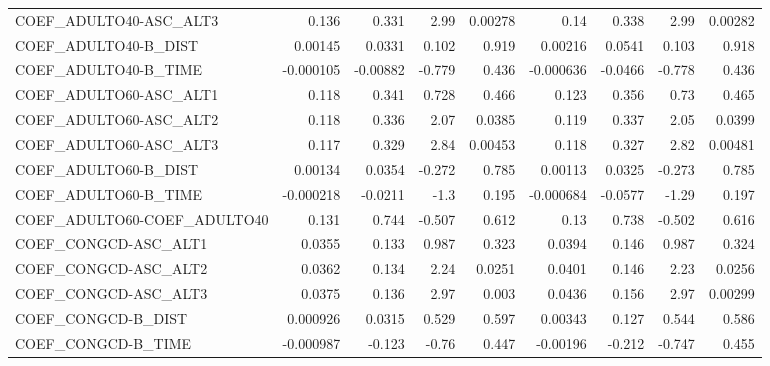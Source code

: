 \begin{tabular}{lrrrrrrrr}
COEF\_ADULTO40-ASC\_ALT3            &       0.136 &        0.331 &    2.99 &  0.00278 &       0.14 &       0.338 &         2.99 &       0.00282 \\
COEF\_ADULTO40-B\_DIST              &     0.00145 &       0.0331 &   0.102 &    0.919 &    0.00216 &      0.0541 &        0.103 &         0.918 \\
COEF\_ADULTO40-B\_TIME              &   -0.000105 &     -0.00882 &  -0.779 &    0.436 &  -0.000636 &     -0.0466 &       -0.778 &         0.436 \\
COEF\_ADULTO60-ASC\_ALT1            &       0.118 &        0.341 &   0.728 &    0.466 &      0.123 &       0.356 &         0.73 &         0.465 \\
COEF\_ADULTO60-ASC\_ALT2            &       0.118 &        0.336 &    2.07 &   0.0385 &      0.119 &       0.337 &         2.05 &        0.0399 \\
COEF\_ADULTO60-ASC\_ALT3            &       0.117 &        0.329 &    2.84 &  0.00453 &      0.118 &       0.327 &         2.82 &       0.00481 \\
COEF\_ADULTO60-B\_DIST              &     0.00134 &       0.0354 &  -0.272 &    0.785 &    0.00113 &      0.0325 &       -0.273 &         0.785 \\
COEF\_ADULTO60-B\_TIME              &   -0.000218 &      -0.0211 &    -1.3 &    0.195 &  -0.000684 &     -0.0577 &        -1.29 &         0.197 \\
COEF\_ADULTO60-COEF\_ADULTO40       &       0.131 &        0.744 &  -0.507 &    0.612 &       0.13 &       0.738 &       -0.502 &         0.616 \\
COEF\_CONGCD-ASC\_ALT1              &      0.0355 &        0.133 &   0.987 &    0.323 &     0.0394 &       0.146 &        0.987 &         0.324 \\
COEF\_CONGCD-ASC\_ALT2              &      0.0362 &        0.134 &    2.24 &   0.0251 &     0.0401 &       0.146 &         2.23 &        0.0256 \\
COEF\_CONGCD-ASC\_ALT3              &      0.0375 &        0.136 &    2.97 &    0.003 &     0.0436 &       0.156 &         2.97 &       0.00299 \\
COEF\_CONGCD-B\_DIST                &    0.000926 &       0.0315 &   0.529 &    0.597 &    0.00343 &       0.127 &        0.544 &         0.586 \\
COEF\_CONGCD-B\_TIME                &   -0.000987 &       -0.123 &   -0.76 &    0.447 &   -0.00196 &      -0.212 &       -0.747 &         0.455 \\

\end{tabular}
